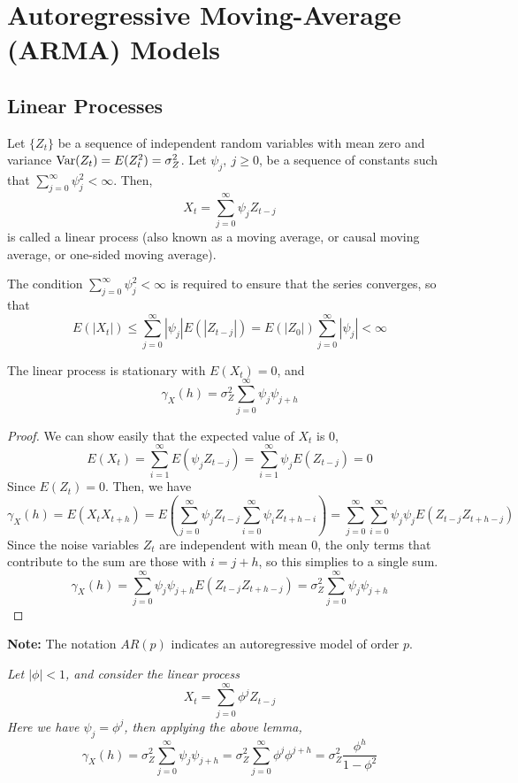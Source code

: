 
\chapter{Autoregressive Moving-Average (ARMA) Models} 

\section{Linear Processes}

\begin{definition}\label{def:linear_process}
    Let $\{Z_t\}$ be a sequence of independent random variables with mean zero and variance $\operatorname{Var}(Z_t) = E(Z_t^2) = \sigma_Z^2$. Let $\psi_j, \ j \geq 0$, be a sequence of constants such that $\sum_{j=0}^\infty \psi_j^2 < \infty$. Then, 
    \[X_t = \sum_{j=0}^\infty \psi_jZ_{t-j}\]
    is called a linear process (also known as a moving average, or causal moving average, or one-sided moving average).
\end{definition}
\noindent
The condition $\sum_{j=0}^\infty \psi_j^2 < \infty$ is required to ensure that the series converges, so that
\[E(|X_t|) \leq \sum_{j=0}^\infty |\psi_j| E(|Z_{t-j}|) = E(|Z_0|) \sum_{j=0}^{\infty}|\psi_j| < \infty\]

\begin{lemma}\label{lemma:linear_acf}
    The linear process is stationary with $E(X_t) = 0$, and 
    \[\gamma_X(h) = \sigma_Z^2\sum_{j=0}^\infty \psi_j\psi_{j+h}\]
\end{lemma}

\begin{proof}
    We can show easily that the expected value of $X_t$ is 0,
    \[E(X_t) = \sum_{i=1}^\infty E(\psi_jZ_{t-j}) = \sum_{i=1}^\infty \psi_jE(Z_{t-j}) = 0\]
    Since $E(Z_t) = 0$. Then, we have 
    \[\gamma_X(h) = E(X_tX_{t+h}) = E\left(\sum_{j=0}^\infty \psi_jZ_{t-j}\sum_{i=0}^\infty \psi_iZ_{t+h-i}\right) = \sum_{j=0}^\infty\sum_{i=0}^\infty\psi_j\psi_jE(Z_{t-j}Z_{t+h-j})\]
    Since the noise variables $Z_t$ are independent with mean 0, the only terms that contribute to the sum are those with $i = j + h$, so this simplies to a single sum.
    \[\gamma_X(h) = \sum_{j=0}^\infty \psi_j\psi_{j+h}E(Z_{t-j}Z_{t+h-j}) = \sigma_Z^2\sum_{j=0}^\infty \psi_j\psi_{j+h}\]
\end{proof}

\noindent
\textbf{Note:} The notation $AR(p)$ indicates an autoregressive model of order $p$.

\begin{example}[AR(1)]\label{ex:ar1_acf}
    \emph{
        Let $|\phi| < 1$, and consider the linear process
        \[X_t = \sum_{j=0}^\infty \phi^jZ_{t-j}\]
        Here we have $\psi_j = \phi^j$, then applying the above lemma, 
        \[\gamma_X(h) = \sigma_Z^2\sum_{j=0}^\infty \psi_j\psi_{j+h} = \sigma_Z^2 \sum_{j=0}^\infty \phi^{j}\phi^{j+h} = \sigma^2_Z\frac{\phi^h}{1-\phi^2}\]
    }
\end{example}

